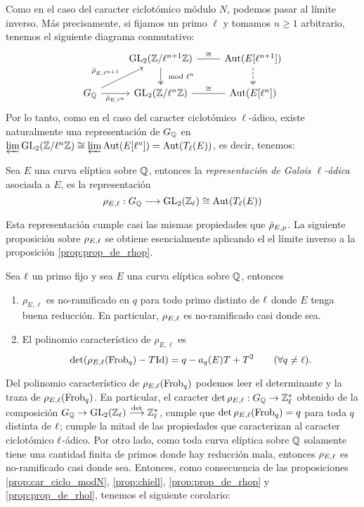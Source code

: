 Como en el caso del caracter ciclot\'omico m\'odulo $N$, podemos pasar al l\'imite inverso. M\'as precisamente, si fijamos un primo $\ell$ y tomamos $n\geq1$ arbitrario, tenemos el siguiente diagrama conmutativo:
\[
  \begin{tikzcd}
    &
    \GL_2(\ZZ/\ell^{n+1}\ZZ) \arrow[d,two heads,"\mod \ell^n"]
    \arrow[r,dash,"\cong"]&
    \text{Aut}(E[\ell^{n+1}]) \arrow[d,two heads,dashed]\\
    \GQ \arrow[ru,"\bar{\rho}_{E,\ell^{n+1}}"] \arrow[r,"\bar{\rho}_{E,\ell^n}"']&
    \GL_2(\ZZ/\ell^n\ZZ) \arrow[r,dash,"\cong"]&
    \text{Aut}(E[\ell^n])
  \end{tikzcd}
\]
Por lo tanto, como en el caso del caracter ciclot\'omico $\ell$-\'adico, existe naturalmente una representaci\'on de $G_{\mathbb{Q}}$ en $\varprojlim\mathrm{GL}_2(\mathbb{Z}/\ell^n\mathbb{Z})\cong\varprojlim\text{Aut}(E[\ell^n])=\text{Aut}(T_{\ell}(E))$, es decir, tenemos:

\begin{defin}
  Sea $E$ una curva el\'iptica sobre $\mathbb{Q}$, entonces la \emph{representaci\'on de Galois
    $\ell$-\'adica} asociada a $E$, es la representaci\'on
  \[
    \rho_{E,\ell}:G_{\mathbb{Q}}\longrightarrow\mathrm{GL}_2(\mathbb{Z}_{\ell})\cong\text{Aut}(T_{\ell}(E))
  \]
\end{defin}

Esta representaci\'on cumple casi las mismas propiedades que $\bar{\rho}_{E,p}$. La siguiente proposici\'on sobre $\rho_{E,\ell}$ se obtiene esencialmente aplicando el el l\'imite inverso a la proposici\'on \ref{prop:prop_de_rhop}.

\begin{prop}\label{prop:prop_de_rhol}
  Sea $\ell$ un primo fijo y sea $E$ una curva el\'iptica sobre $\mathbb{Q}$, entonces
  \begin{enumerate}[label=\roman*)]
  \item $\rho_{E,\ell}$ es no-ramificado en $q$ para todo primo distinto de $\ell$ donde $E$ tenga buena reducci\'on. En particular, $\rho_{E,\ell}$ es no-ramificado casi donde sea.
  \item El polinomio caracter\'istico de $\rho_{E,\ell}$ es
    \[
      \det(\rho_{E,\ell}(\mathrm{Frob}_q)-T\mathrm{Id})=q-a_q(E)T+T^2 \qquad(\forall q\neq \ell).
    \]
  \end{enumerate}
\end{prop}

Del polinomio caracter\'istico de $\rho_{E,\ell}(\mathrm{Frob}_q)$ podemos leer el determinante y la traza de $\rho_{E,\ell}(\mathrm{Frob}_q)$. En particular, el caracter $\det\rho_{E,\ell}:G_{\mathbb{Q}}\rightarrow\mathbb{Z}^*_{\ell}$ obtenido de la composici\'on $G_{\mathbb{Q}}\rightarrow\mathrm{GL}_2(\mathbb{Z}_{\ell})\overset{\det}{\longrightarrow}\mathbb{Z}^*_{\ell}$, cumple que $\det\rho_{E,\ell}(\mathrm{Frob}_q)=q$ para toda $q$ distinta de $\ell$; cumple la mitad de las propiedades que caracterizan al caracter ciclot\'omico $\ell$-\'adico. Por otro lado, como toda curva el\'iptica
sobre $\mathbb{Q}$ solamente tiene una cantidad finita de primos donde hay reducci\'on mala, entonces $\rho_{E,\ell}$ es no-ramificado casi donde sea. Entonces, como consecuencia de las proposiciones \ref{prop:car_ciclo_modN}, \ref{prop:chiell}, \ref{prop:prop_de_rhop}  y \ref{prop:prop_de_rhol}, tenemos el siguiente corolario:

